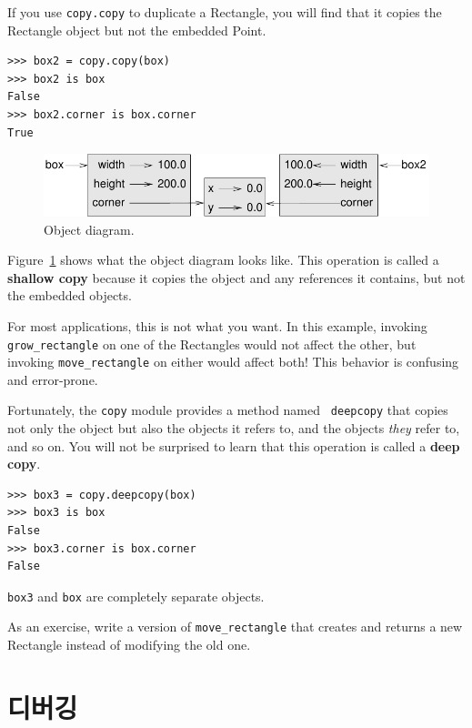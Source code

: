 \documentclass[10pt]{book}
\begin{document}
If you use {\tt copy.copy} to duplicate a Rectangle, you will find
that it copies the Rectangle object but not the embedded Point.

\begin{verbatim}
>>> box2 = copy.copy(box)
>>> box2 is box
False
>>> box2.corner is box.corner
True
\end{verbatim}

\begin{figure}
\centerline
{\includegraphics[scale=0.8]{figs/rectangle2.pdf}}
\caption{Object diagram.}
\label{fig.rectangle2}
\end{figure}

Figure~\ref{fig.rectangle2} shows what the object diagram looks like.
This operation is called a {\bf shallow copy} because it copies the
object and any references it contains, but not the embedded objects.

For most applications, this is not what you want.  In this example,
invoking \verb"grow_rectangle" on one of the Rectangles would not
affect the other, but invoking \verb"move_rectangle" on either would
affect both!  This behavior is confusing and error-prone.

Fortunately, the {\tt copy} module provides a method named {\tt
deepcopy} that copies not only the object but also 
the objects it refers to, and the objects {\em they} refer to,
and so on.
You will not be surprised to learn that this operation is
called a {\bf deep copy}.

\begin{verbatim}
>>> box3 = copy.deepcopy(box)
>>> box3 is box
False
>>> box3.corner is box.corner
False
\end{verbatim}
%
{\tt box3} and {\tt box} are completely separate objects.

As an exercise, write a version of \verb"move_rectangle" that creates and
returns a new Rectangle instead of modifying the old one.


\section{디버깅}
\label{hasattr}
\end{document}
